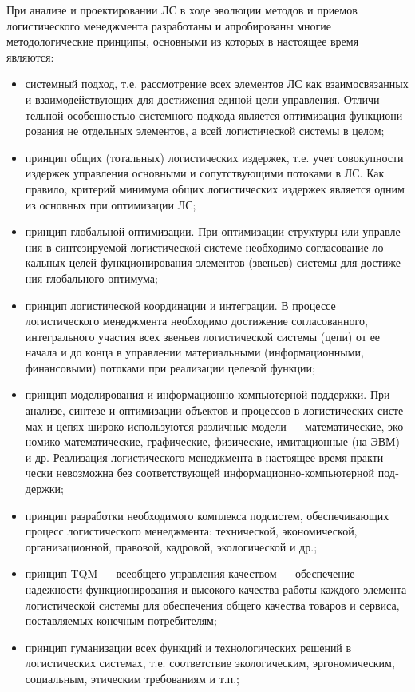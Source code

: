 При анализе и проектировании ЛС в ходе эволюции методов и приемов логистиче­ского менеджмента разработаны и апроби­рованы многие методологические прин­ципы, основными из которых в настоящее время являются:
\begin{itemize}
	\item системный подход, т.е. рассмотрение всех элементов ЛС как взаимосвязан­ных и взаимодействующих для достиже­ния единой цели управления.
	Отличи­тельной особенностью системного под­хода является оптимизация функциони­рования не отдельных элементов, а всей логистической системы в целом;
	\item  принцип общих (тотальных) логистиче­ских издержек, т.е. учет совокупности издержек управления основными и со­путствующими потоками в ЛС. Как правило, критерий минимума общих логистических издержек является од­ним из основных при оптимизации ЛС;
	\item  принцип глобальной оптимизации.
	При оптимизации структуры или управле­ния в синтезируемой логистической системе необходимо согласование ло­кальных целей функционирования эле­ментов (звеньев) системы для достиже­ния глобального оптимума;
	\item принцип логистической координации и ин­теграции.
	В процессе логистического менеджмента необходимо достижение	согласованного, интегрального участия всех звеньев логистической системы (цепи) от ее начала и до конца в управ­лении материальными (информацион­ными, финансовыми) потоками при ре­ализации целевой функции;
	\item принцип моделирования и информаци­онно-компьютерной поддержки.
	При	анализе, синтезе и оптимизации объек­тов и процессов в логистических систе­мах и цепях широко используются раз­личные модели --- математические, эко­номико-математические, графические,	физические, имитационные (на ЭВМ) и др.
	Реализация логистического ме­неджмента в настоящее время практи­чески невозможна без соответствующей информационно-компьютерной под­держки;
	\item принцип разработки необходимого комп­лекса подсистем, обеспечивающих про­цесс логистического менеджмента: тех­нической, экономической, организаци­онной, правовой, кадровой, экологи­ческой и др.;
	\item принцип TQM --- всеобщего управления качеством --- обеспечение надежности функционирования и высокого каче­ства работы каждого элемента логисти­ческой системы для обеспечения об­щего качества товаров и сервиса, по­ставляемых конечным потребителям;
	\item принцип гуманизации всех функций и тех­нологических решений в логистических системах, т.е. соответствие экологиче­ским, эргономическим, социальным, этическим требованиям и т.п.;

\end{itemize}
